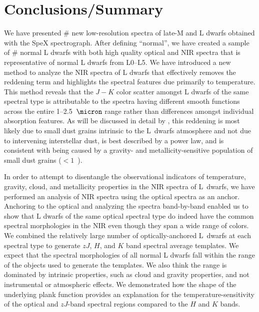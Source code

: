 \documentclass[12pt,preprint]{aastex}
\begin{document}
								   
								    
\clearpage 
\section{Conclusions/Summary}
\label{sec:summary}

We have presented \# new low-resolution spectra of late-M and L dwarfs obtained with the SpeX spectrograph.
After defining ``normal'', we have created a sample of \# normal L dwarfs with both high quality optical and NIR spectra that is representative of normal L dwarfs from L0--L5.
We have introduced a new method to analyze the NIR spectra of L dwarfs that effectively removes the reddening term and highlights the spectral features due primarily to temperature. 
This method reveals that the $J-K$ color scatter amongst L dwarfs of the same spectral type is attributable to the spectra having different smooth functions across the entire 1--2.5~$\micron$ range rather than differences amongst individual absorption features.
As will be discussed in detail by \citet[in prep.]{Hiranaka:2015va}, this reddening is most likely due to small dust grains intrinsic to the L~dwarfs atmosphere and not due to intervening interstellar dust, is best described by a power law, and is consistent with being caused by a gravity- and metallicity-sensitive population of small dust grains ($<1$~\micron).

In order to attempt to disentangle the observational indicators of temperature, gravity, cloud, and metallicity properties in the NIR spectra of L~dwarfs, we have performed an analysis of NIR spectra using the optical spectra as an anchor.
Anchoring to the optical and analyzing the spectra band-by-band enabled us to show that L dwarfs of the same optical spectral type do indeed have the common spectral morphologies in the NIR even though they span a wide range of colors.
We combined the relatively large number of optically-anchored L~dwarfs at each spectral type to generate $zJ$, $H$, and $K$ band spectral average templates. We expect that the spectral morphologies of all normal L dwarfs fall within the range of the objects used to generate the templates. We also think the range is dominated by intrinsic properties, such as cloud and gravity properties, and not instrumental or atmospheric effects.
We demonstrated how the shape of the underlying plank function provides an explanation for the temperature-sensitivity of the optical and $zJ$-band spectral regions compared to the $H$ and $K$ bands.
\end{document}
